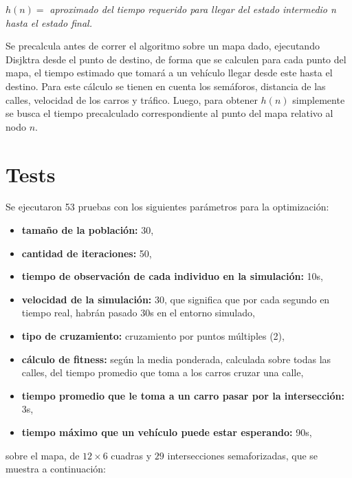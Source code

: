 \documentclass[colorinlistoftodos,twoside,twocolumn]{article} %
\begin{document}
		
	\begin{center}
		\vspace{0.5em}
		\textit{$ h(n) = $ } \textit{aproximado del tiempo requerido para llegar del estado intermedio n \hspace{8em} hasta el estado final.}
	\end{center}

	Se precalcula antes de correr el algoritmo sobre un mapa dado, ejecutando Disjktra desde el punto de destino, de forma que se calculen para cada punto del mapa, el tiempo estimado que tomar\'a a un veh\'iculo llegar desde este hasta el destino. Para este c\'alculo se tienen en cuenta los sem\'aforos, distancia de las calles, velocidad de los carros y tr\'afico. Luego, para obtener $ h(n) $ simplemente se busca el tiempo precalculado correspondiente al punto del mapa relativo al nodo $n$.
	

	\section{Tests}
	
	Se ejecutaron 53 pruebas con los siguientes par\'ametros para la optimizaci\'on:
	\begin{itemize}
		\item \textbf{tama\~no de la poblaci\'on:} 30,
		\item \textbf{cantidad de iteraciones:} 50,
		\item \textbf{tiempo de observaci\'on de cada individuo en la simulaci\'on:} 10s,
		\item \textbf{velocidad de la simulaci\'on:} 30, que significa que por cada segundo en tiempo real, habr\'an pasado 30s en el entorno simulado,
		\item \textbf{tipo de cruzamiento:} cruzamiento por puntos m\'ultiples (2),
		\item \textbf{c\'alculo de fitness:} seg\'un la media ponderada, calculada sobre todas las calles, del tiempo promedio que toma a los carros cruzar una calle,
		\item \textbf{tiempo promedio que le toma a un carro pasar por la intersección:} 3s,
		\item \textbf{tiempo máximo que un vehículo puede estar esperando:} 90s,
	\end{itemize}
	sobre el mapa, de $ 12 \times 6 $ cuadras y $ 29 $ intersecciones semaforizadas, que se muestra a continuaci\'on:
	
\end{document}
